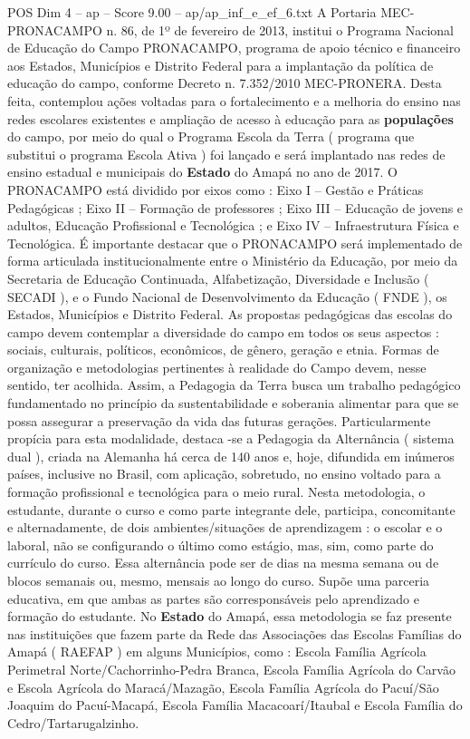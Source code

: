 \begin{textsample}{POS Dim 4 – ap – Score 9.00 – ap/ap\_inf\_e\_ef\_6.txt}
A Portaria MEC-PRONACAMPO n. 86, de 1º de fevereiro de 2013, institui o Programa Nacional de Educação do Campo PRONACAMPO, programa de apoio técnico e financeiro aos Estados, Municípios e Distrito Federal para a implantação da política de educação do campo, conforme Decreto n. 7.352/2010 MEC-PRONERA.
Desta feita, contemplou ações voltadas para o fortalecimento e a melhoria do ensino nas redes escolares existentes e ampliação de acesso à educação para as \textbf{populações} do campo, por meio do qual o Programa Escola da Terra ( programa que substitui o programa Escola Ativa ) foi lançado e será implantado nas redes de ensino estadual e municipais do \textbf{Estado} do Amapá no ano de 2017.
O PRONACAMPO está dividido por eixos como : Eixo I – Gestão e Práticas Pedagógicas ; Eixo II – Formação de professores ; Eixo III – Educação de jovens e adultos, Educação Profissional e Tecnológica ; e Eixo IV – Infraestrutura Física e Tecnológica.
É importante destacar que o PRONACAMPO será implementado de forma articulada institucionalmente entre o Ministério da Educação, por meio da Secretaria de Educação Continuada, Alfabetização, Diversidade e Inclusão ( SECADI ), e o Fundo Nacional de Desenvolvimento da Educação ( FNDE ), os Estados, Municípios e Distrito Federal.
As propostas pedagógicas das escolas do campo devem contemplar a diversidade do campo em todos os seus aspectos : sociais, culturais, políticos, econômicos, de gênero, geração e etnia.
Formas de organização e metodologias pertinentes à realidade do Campo devem, nesse sentido, ter acolhida.
Assim, a Pedagogia da Terra busca um trabalho pedagógico fundamentado no princípio da sustentabilidade e soberania alimentar para que se possa assegurar a preservação da vida das futuras gerações.
Particularmente propícia para esta modalidade, destaca -se a Pedagogia da Alternância ( sistema dual ), criada na Alemanha há cerca de 140 anos e, hoje, difundida em inúmeros países, inclusive no Brasil, com aplicação, sobretudo, no ensino voltado para a formação profissional e tecnológica para o meio rural.
Nesta metodologia, o estudante, durante o curso e como parte integrante dele, participa, concomitante e alternadamente, de dois ambientes/situações de aprendizagem : o escolar e o laboral, não se configurando o último como estágio, mas, sim, como parte do currículo do curso.
Essa alternância pode ser de dias na mesma semana ou de blocos semanais ou, mesmo, mensais ao longo do curso.
Supõe uma parceria educativa, em que ambas as partes são corresponsáveis pelo aprendizado e formação do estudante.
No \textbf{Estado} do Amapá, essa metodologia se faz presente nas instituições que fazem parte da Rede das Associações das Escolas Famílias do Amapá ( RAEFAP ) em alguns Municípios, como : Escola Família Agrícola Perimetral Norte/Cachorrinho-Pedra Branca, Escola Família Agrícola do Carvão e Escola Agrícola do Maracá/Mazagão, Escola Família Agrícola do Pacuí/São Joaquim do Pacuí-Macapá, Escola Família Macacoarí/Itaubal e Escola Família do Cedro/Tartarugalzinho.

\end{textsample}
